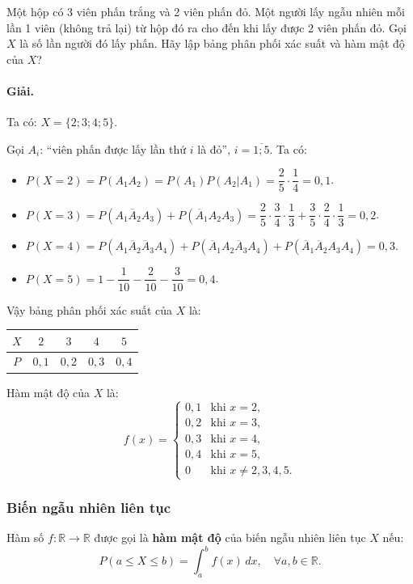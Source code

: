 \begin{vidu}[VD 4]
Một hộp có 3 viên phấn trắng và 2 viên phấn đỏ. Một người lấy ngẫu nhiên mỗi lần 1 viên (không trả lại) từ hộp đó ra cho đến khi lấy được 2 viên phấn đỏ. Gọi $X$ là số lần người đó lấy phấn. Hãy lập bảng phân phối xác suất và hàm mật độ của $X$?

\paragraph{Giải.} Ta có: $X = \{2; 3; 4; 5\}$.

Gọi $A_i$: ``viên phấn được lấy lần thứ $i$ là đỏ'', $i = \overline{1; 5}$.
Ta có:
\begin{itemize}
    \item $P(X = 2) = P(A_1 A_2) = P(A_1) P(A_2 | A_1) = \dfrac{2}{5} \cdot \dfrac{1}{4} = 0{,}1$.
    \item $P(X = 3) = P(A_1 \overline{A}_2 A_3) + P(\overline{A}_1 A_2 A_3) = \dfrac{2}{5} \cdot \dfrac{3}{4} \cdot \dfrac{1}{3} + \dfrac{3}{5} \cdot \dfrac{2}{4} \cdot \dfrac{1}{3} = 0{,}2$.
    \item $P(X = 4) = P(A_1 \overline{A}_2 \overline{A}_3 A_4) + P(\overline{A}_1 A_2 \overline{A}_3 A_4) + P(\overline{A}_1 \overline{A}_2 A_3 A_4) = 0{,}3$.
    \item $P(X = 5) = 1 - \dfrac{1}{10} - \dfrac{2}{10} - \dfrac{3}{10} = 0{,}4$.
\end{itemize}

Vậy bảng phân phối xác suất của $X$ là:
\begin{center}
\begin{tabular}{|c|c|c|c|c|}
\hline
$X$ & $2$ & $3$ & $4$ & $5$ \\
\hline
$P$ & $0{,}1$ & $0{,}2$ & $0{,}3$ & $0{,}4$ \\
\hline
\end{tabular}
\end{center}

Hàm mật độ của $X$ là:
\[
f(x) = \begin{cases}
0{,}1 & \text{khi } x = 2, \\
0{,}2 & \text{khi } x = 3, \\
0{,}3 & \text{khi } x = 4, \\
0{,}4 & \text{khi } x = 5, \\
0 & \text{khi } x \ne 2, 3, 4, 5.
\end{cases}
\]
\end{vidu}

\subsubsection{Biến ngẫu nhiên liên tục}
Hàm số $f: \mathbb{R} \to \mathbb{R}$ được gọi là \textbf{hàm mật độ} của biến ngẫu nhiên liên tục $X$ nếu:
\[
P(a \le X \le b) = \int_a^b f(x)\,dx, \quad \forall a, b \in \mathbb{R}.
\]

